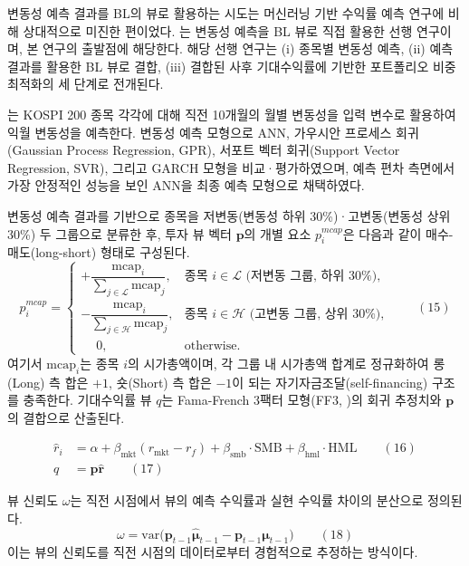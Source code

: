 \documentclass{article}
\begin{document}
변동성 예측 결과를 BL의 뷰로 활용하는 시도는 머신러닝 기반 수익률 예측 연구에 비해 상대적으로 미진한 편이었다. \citet{pyo2018}는 변동성 예측을 BL 뷰로 직접 활용한 선행 연구이며, 본 연구의 출발점에 해당한다. 해당 선행 연구는 (i) 종목별 변동성 예측, (ii) 예측 결과를 활용한 BL 뷰로 결합, (iii) 결합된 사후 기대수익률에 기반한 포트폴리오 비중 최적화의 세 단계로 전개된다.

\citet{pyo2018}는 KOSPI 200 종목 각각에 대해 직전 10개월의 월별 변동성을 입력 변수로 활용하여 익월 변동성을 예측한다. 변동성 예측 모형으로 ANN, 가우시안 프로세스 회귀(Gaussian Process Regression, GPR), 서포트 벡터 회귀(Support Vector Regression, SVR), 그리고 GARCH 모형을 비교·평가하였으며, 예측 편차 측면에서 가장 안정적인 성능을 보인 ANN을 최종 예측 모형으로 채택하였다.

변동성 예측 결과를 기반으로 종목을 저변동(변동성 하위 30\%)·고변동(변동성 상위 30\%) 두 그룹으로 분류한 후, 투자 뷰 벡터 $\mathbf{p}$의 개별 요소  $p_i^{mcap}$은 다음과 같이 매수-매도(long-short) 형태로 구성된다.
\begin{equation}
    p_i^{mcap} = \begin{cases}
    +\dfrac{\mathrm{mcap}_i}{\sum_{j \in \mathcal{L}} \mathrm{mcap}_j},  & \text{종목 } i \in \mathcal{L} \text{ (저변동 그룹, 하위 30\%)} ,\\[8pt]
    -\dfrac{\mathrm{mcap}_i}{\sum_{j \in \mathcal{H}} \mathrm{mcap}_j}, & \text{종목 } i \in \mathcal{H} \text{ (고변동 그룹, 상위 30\%)}, \\[6pt]
    \phantom{+}0,                & \text{otherwise}.
\end{cases} \qquad(15)\end{equation}
여기서 $\mathrm{mcap}_i$는 종목 $i$의 시가총액이며, 각 그룹 내 시가총액 합계로 정규화하여 롱(Long) 측 합은 $+1$, 숏(Short) 측 합은 $-1$이 되는 자기자금조달(self-financing) 구조를 충족한다. 기대수익률 뷰 $q$는 Fama-French 3팩터 모형(FF3, \citep{fama1993common})의 회귀 추정치와 $\mathbf{p}$의 결합으로 산출된다.

\begin{align}
\hat{r}_i &= \alpha + \beta_{\text{mkt}}(r_{\text{mkt}} - r_f)
           + \beta_{\text{smb}} \cdot \text{SMB}
           + \beta_{\text{hml}} \cdot \text{HML} \qquad(16)\\
q &= \mathbf{p} \hat{\mathbf{r}} \qquad(17)\end{align}

뷰 신뢰도 $\omega$는 직전 시점에서 뷰의 예측 수익률과 실현 수익률 차이의 분산으로 정의된다.
\begin{equation}
\omega = \mathrm{var}\bigl(\mathbf{p}_{t-1} \hat{\boldsymbol{\mu}}_{t-1}
       - \mathbf{p}_{t-1} \boldsymbol{\mu}_{t-1}\bigr) \qquad(18)\end{equation}
이는 뷰의 신뢰도를 직전 시점의 데이터로부터 경험적으로 추정하는 방식이다.
\end{document}
